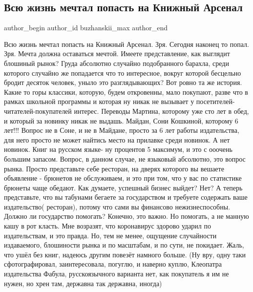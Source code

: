  
 
 
 
 
 
\subsection{Всю жизнь мечтал попасть на Книжный Арсенал}
\label{sec:24_06_2021.fb.buzhanskii_max.1.knizhnii_arsenal}
\ifcmt
 author_begin
   author_id buzhanskii_max
 author_end
\fi

Всю жизнь мечтал попасть на Книжный Арсенал.
Зря.
Сегодня наконец то попал.
Зря.
Мечта должна оставаться мечтой.
Имеете представление, как выглядит блошиный рынок?
Груда абсолютно случайно подобранного барахла, среди которого случайно же попадается что то интересное, вокруг которой бесцельно бродит десяток человек, уныло это разглядывающих?
Вот ровно та же история.
Какие то горы классики, которую, будем откровенны, мало покупают, разве что в рамках школьной программы и которая ну никак не вызывает у посетителей-читателей-покупателей интерес.
Переводы Мартина, которому уже сто лет в обед, и который за новинку никак не выдашь.
Майдан, Сони Кошкиной, которому 6 лет!!!
Вопрос не в Соне, и не в Майдане, просто за 6 лет работы издательства, для него просто не может найтись место на прилавке среди новинок.
А нет новинок.
Книг на русском языке- ну процентов 5 максимум, и это с ооочень большим запасом.
Вопрос, в данном случае, не языковый абсолютно, это вопрос рынка.
Просто представьте себе ресторан, на дверях которого вы вешаете объявление - брюнетов не обслуживаем, и это при том, что у вас по статистике брюнеты чаще обедают.
Как думаете, успешный бизнес выйдет?
Нет?
А теперь представьте, что вы табунами бегаете за государством и требуете содержать ваше издательство( ресторан), потому что сами вы финансово нежизнеспособны.
Должно ли государство помогать?
Конечно, это важно.
Но помогать, а не манную кашу в рот класть.
Мне возразят, что коронавирус здорово ударил по издательствам, и это правда.
Но, тем не менее, ощущение случайности издаваемого, блошиности рынка и по масштабам, и по сути, не покидает.
Жаль, что ушёл без книг, надеюсь другим повезёт намного больше.
(Ну вру, одну таки сфотографировал, заинтересовала, погуглю, и наверно куплю, Клеопатра издательства Фабула, русскоязычного варианта нет, как покупатель я им не нужен, но хрен там, державна так державна, иногда)

